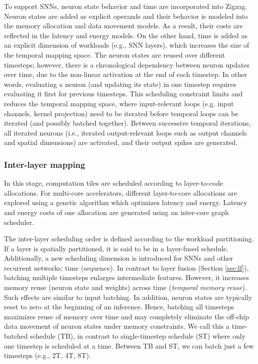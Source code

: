 To support SNNs, neuron state behavior and time are incorporated into Zigzag. Neuron states are added as explicit operands and their behavior is modeled into the memory allocation and data movement models. As a result, their costs are reflected in the latency and energy models. On the other hand, time is added as an explicit dimension of workloads (e.g., SNN layers), which increases the size of the temporal mapping space. The neuron states are reused over different timesteps; however, there is a chronological dependency between neuron updates over time, due to the non-linear activation at the end of each timestep. In other words, evaluating a neuron (and updating its state) in one timestep requires evaluating it first for previous timesteps. This scheduling constraint limits and reduces the temporal mapping space, where input-relevant loops (e.g. input channels, kernel projection) need to be iterated before temporal loops can be iterated (and possibly batched together). Between successive temporal iterations, all iterated neurons (i.e., iterated output-relevant loops such as output channels and spatial dimensions) are activated, and their output spikes are generated.


\subsubsection{Inter-layer mapping}
\label{sec:schedule}
In this stage, computation tiles are scheduled according to layer-to-code allocations. For multi-core accelerators, different layer-to-core allocations are explored using a genetic algorithm which optimizes latency and energy. Latency and energy costs of one allocation are generated using an inter-core graph scheduler. 

The inter-layer scheduling order is defined according to the workload partitioning. If a layer is spatially partitioned, it is said to be in a layer-fused schedule. Additionally, a new scheduling dimension is introduced for SNNs and other recurrent networks; time (sequence). In contrast to layer fusion (Section \ref{sec:lf}), batching multiple timesteps enlarges intermediate features. However, it increases memory reuse (neuron state and weights) across time (\textit{temporal memory reuse}). Such effects are similar to input batching. In addition, neuron states are typically reset to zero at the beginning of an inference. Hence, batching all timesteps maximizes reuse of memory over time and may completely eliminate the off-chip data movement of neuron states under memory constraints. We call this a time-batched schedule (TB), in contrast to single-timestep schedule (ST) where only one timestep is scheduled at a time. Between TB and ST, we can batch just a few timesteps (e.g., 2T, 4T, 8T).

